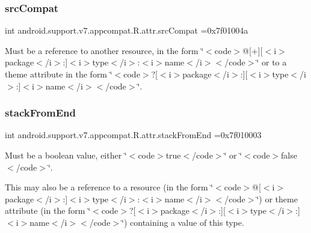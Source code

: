 \subsubsection{\texorpdfstring{src\+Compat}{srcCompat}}
{\footnotesize\ttfamily int android.\+support.\+v7.\+appcompat.\+R.\+attr.\+src\+Compat =0x7f01004a\hspace{0.3cm}{\ttfamily [static]}}

Must be a reference to another resource, in the form \char`\"{}$<$code$>$@\mbox{[}+\mbox{]}\mbox{[}$<$i$>$package$<$/i$>$\+:\mbox{]}$<$i$>$type$<$/i$>$\+:$<$i$>$name$<$/i$>$$<$/code$>$\char`\"{} or to a theme attribute in the form \char`\"{}$<$code$>$?\mbox{[}$<$i$>$package$<$/i$>$\+:\mbox{]}\mbox{[}$<$i$>$type$<$/i$>$\+:\mbox{]}$<$i$>$name$<$/i$>$$<$/code$>$\char`\"{}. \mbox{\label{classandroid_1_1support_1_1v7_1_1appcompat_1_1R_1_1attr_a289a58377dd0ca0cc2c1a23520dc61fc}} 
\subsubsection{\texorpdfstring{stack\+From\+End}{stackFromEnd}}
{\footnotesize\ttfamily int android.\+support.\+v7.\+appcompat.\+R.\+attr.\+stack\+From\+End =0x7f010003\hspace{0.3cm}{\ttfamily [static]}}

Must be a boolean value, either \char`\"{}$<$code$>$true$<$/code$>$\char`\"{} or \char`\"{}$<$code$>$false$<$/code$>$\char`\"{}. 

This may also be a reference to a resource (in the form \char`\"{}$<$code$>$@\mbox{[}$<$i$>$package$<$/i$>$\+:\mbox{]}$<$i$>$type$<$/i$>$\+:$<$i$>$name$<$/i$>$$<$/code$>$\char`\"{}) or theme attribute (in the form \char`\"{}$<$code$>$?\mbox{[}$<$i$>$package$<$/i$>$\+:\mbox{]}\mbox{[}$<$i$>$type$<$/i$>$\+:\mbox{]}$<$i$>$name$<$/i$>$$<$/code$>$\char`\"{}) containing a value of this type. \mbox{\label{classandroid_1_1support_1_1v7_1_1appcompat_1_1R_1_1attr_a2270d0961fce2e58048505a0cca06919}} 
